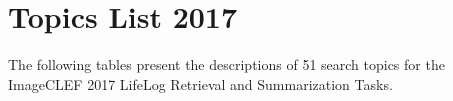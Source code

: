 \newpage
\appendix

\section{Topics List 2017}\label{app:topics}
%
The following tables present the descriptions of 51 search topics for the ImageCLEF 2017 LifeLog Retrieval and Summarization Tasks.



